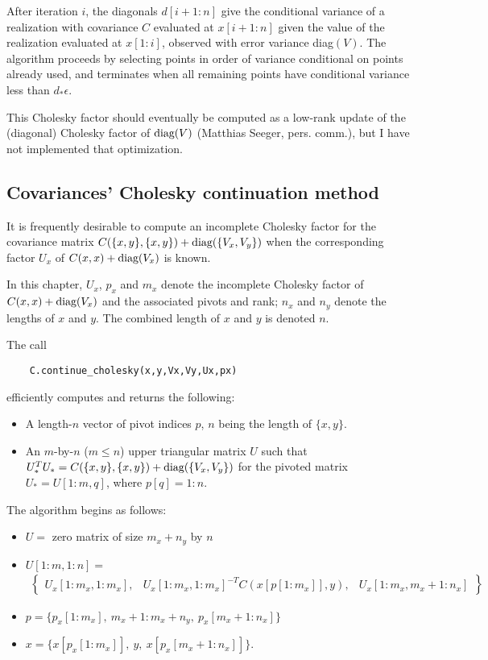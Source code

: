\documentclass{report}
\begin{document}
\medskip
After iteration $i$, the diagonals $d[i+1:n]$ give the conditional variance of a realization with covariance $C$ evaluated at $x[i+1:n]$ given the value of the realization evaluated at $x[1:i]$, observed with error variance diag$(V)$. The algorithm proceeds by selecting points in order of variance conditional on points already used, and terminates when all remaining points have conditional variance less than $d_*\epsilon$.

This Cholesky factor should eventually be computed as a low-rank update \cite{Seeger} of the (diagonal) Cholesky factor of $\textup{diag}(V)$ (Matthias Seeger, pers. comm.), but I have not implemented that optimization.

\subsection{Covariances' Cholesky continuation method}
It is frequently desirable to compute an incomplete Cholesky factor for the covariance matrix
$C(\{x,y\},\{x,y\}) + \textup{diag}(\{V_x,V_y\})$ when the corresponding factor $U_x$ of $C(x,x) + \textup{diag}(V_x)$ is known.

In this chapter, $U_x$, $p_x$ and $m_x$ denote the incomplete Cholesky factor of $C(x,x)+\textup{diag}(V_x)$ and the associated pivots and rank; $n_x$ and $n_y$ denote the lengths of $x$ and $y$. The combined length of $x$ and $y$ is denoted $n$.

The call
\begin{verbatim}
    C.continue_cholesky(x,y,Vx,Vy,Ux,px)
\end{verbatim}
efficiently computes and returns the following:
\begin{itemize}
    \item A length-$n$ vector of pivot indices $p$, $n$ being the length of $\{x,y\}$.
    \item An $m$-by-$n$ ($m\le n$) upper triangular matrix $U$ such that $U_*^TU_* = C(\{x,y\},\{x,y\}) + \textup{diag}(\{V_x,V_y\})$ for the pivoted matrix $U_* = U[1:m,q]$, where $p[q]=1:n$.
\end{itemize}

The algorithm begins as follows:
\begin{itemize}
    \item $U=$ zero matrix of size $m_x+n_y$ by $n$
    \item$U[1:m,1:n]=$ \begin{eqnarray*}
        \left\{\begin{array}{ccc}
            U_x[1:m_x,1:m_x],&U_x[1:m_x,1:m_x]^{-T} C(x[p[1:m_x]], y),&U_x[1:m_x,m_x+1:n_x]
        \end{array}\right\}
    \end{eqnarray*}
    \item $p=\{p_x[1:m_x],\ m_x+1:m_x+n_y,\ p_x[m_x+1:n_x]\}$
    \item $x=\{x[p_x[1:m_x]],\ y,\ x[p_x[m_x+1:n_x]]\}$.
\end{itemize}
\end{document}
